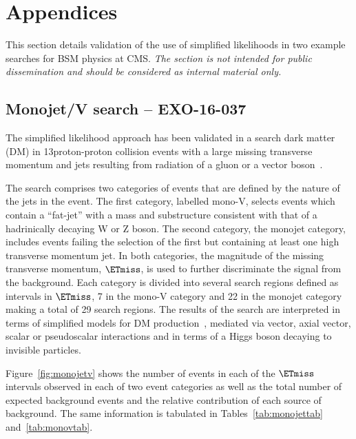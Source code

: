 \section{Appendices}

This section details validation of the use of simplified likelihoods in two example searches for BSM physics at CMS. 
\emph{The section is not intended for public dissemination and should be considered as internal material only.}

\subsection{Monojet/V search -- EXO-16-037}

The simplified likelihood approach has been validated in a search dark matter (DM) in  
13\TeV proton-proton collision events with a large missing transverse momentum and jets resulting from radiation 
of a gluon or a vector boson~\cite{CMS-PAS-EXO-16-037}.

The search comprises two categories of events that are defined by the nature of the jets in the event. 
The first category, labelled mono-V, selects events which contain a ``fat-jet'' with a mass and substructure 
consistent with that of a hadrinically decaying W or Z boson. The second category, the monojet category, 
includes events failing the selection of the first but containing at least one high transverse momentum jet. 
In both categories, the magnitude of the missing transverse momentum, $\ETmiss$, is used to further discriminate the signal from the background.  
Each category is divided into several search regions defined as intervals in $\ETmiss$, 7 in the mono-V category and 22 in the 
monojet category making a total of 29 search regions.  The results of the search are interpreted 
in terms of simplified models for DM production~\cite{simplified1,Buchmueller:2013dya,Buchmueller:2014yoa},
mediated via vector, axial vector, scalar or pseudoscalar interactions and 
in terms of a Higgs boson decaying to invisible particles. 

Figure~\ref{fig:monojetv} shows the number of events in each of the $\ETmiss$ intervals observed in each of two event 
categories as well as the total number of expected background events and the relative contribution of each source of background. The same information 
is tabulated in Tables~\ref{tab:monojettab} and~\ref{tab:monovtab}. 

